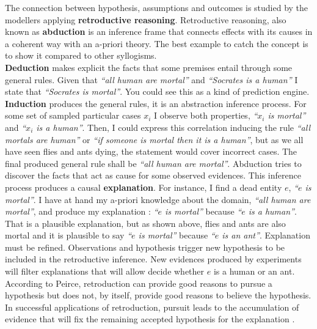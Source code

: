 \documentclass[11pt,oneside,a4paper,openright]{report}
\begin{document}
The connection between hypothesis, assumptions and outcomes is studied by the modellers applying \textbf{retroductive reasoning}\cite[p.34]{Premo2010}. Retroductive reasoning, also known as \textbf{abduction} is an inference frame that connects effects with its causes in a coherent way with an a-priori theory. The best example to catch the concept is to show it compared to other syllogisms.\\ \textbf{Deduction} makes explicit the facts that some premises entail through some general rules. Given that \textit{``all human are mortal''} and \textit{``Socrates is a human''} I state that \textit{``Socrates is mortal''}. You could see this as a kind of prediction engine. \textbf{Induction} produces the general rules, it is an abstraction inference process. For some set of sampled particular cases $x_i$ I observe both properties, \textit{``$x_i$ is mortal''} and \textit{``$x_i$ is a human''}. Then, I could express this correlation inducing the rule \textit{``all mortals are human''} or \textit{``if someone is mortal then it is a human''}, but as we all have seen flies and ants dying, the statement would cover incorrect cases. The final produced general rule shall be \textit{``all human are mortal''}. Abduction tries to discover the facts that act as cause for some observed evidences. This inference process produces a causal \textbf{explanation}. For instance, I find a dead entity $e$, \textit{``$e$ is mortal''}. I have at hand my a-priori knowledge about the domain, \textit{``all human are mortal''}, and produce my explanation : \textit{``$e$ is mortal''} because \textit{``$e$ is a human''}. That is a plausible explanation, but as shown above, flies and ants are also mortal and it is plausible to say \textit{``$e$ is mortal''} because \textit{``$e$ is an ant''}. Explanation must be refined. Observations and hypothesis trigger new hypothesis to be included in the retroductive inference. New evidences produced by experiments will filter explanations that will allow decide whether $e$ is a human or an ant. According to Peirce, retroduction can provide good reasons to pursue a hypothesis but does not, by itself, provide good reasons to believe the hypothesis. In successful applications of retroduction, pursuit leads to the accumulation of evidence that will fix the remaining accepted hypothesis for the explanation \cite{Peirce_Abduction}.\\  
%
\end{document}
